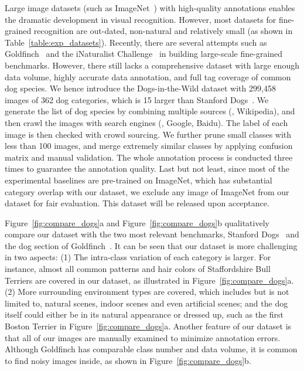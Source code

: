 \documentclass[runningheads]{llncs}
\begin{document}
Large image datasets (such as ImageNet~\cite{deng2009imagenet}) with high-quality annotations enables the dramatic development in visual recognition.
However, most datasets for fine-grained recognition are out-dated, non-natural and relatively small (as shown in Table~\ref{table:exp_datasets}).
Recently, there are several attempts such as Goldfinch~\cite{krause2016unreasonable} and the iNaturalist Challenge~\cite{van2017inaturalist} in building large-scale fine-grained benchmarks.
However, there still lacks a comprehensive dataset with large enough data volume, highly accurate data annotation, and full tag coverage of common dog species.
We hence introduce the Dogs-in-the-Wild dataset with 299,458 images of 362 dog categories, which is 15 larger than Stanford Dogs~\cite{khosla2011novel}.
We generate the list of dog species by combining multiple sources (\eg, Wikipedia), and then crawl the images with search engines (\eg, Google, Baidu).
The label of each image is then checked with crowd sourcing.
We further prune small classes with less than 100 images, and merge extremely similar classes by applying confusion matrix and manual validation.
The whole annotation process is conducted three times to guarantee the annotation quality.
Last but not least, since most of the experimental baselines are pre-trained on ImageNet, which has substantial category overlap with our dataset, we exclude any image of ImageNet from our dataset for fair evaluation.
This dataset will be released upon acceptance.

Figure~\ref{fig:compare_dogs}a and Figure~\ref{fig:compare_dogs}b qualitatively compare our dataset with the two most relevant benchmarks, Stanford Dogs~\cite{khosla2011novel} and the dog section of Goldfinch~\cite{krause2016unreasonable}.
It can be seen that our dataset is more challenging in two aspects:
(1) The intra-class variation of each category is larger.
For instance, almost all common patterns and hair colors of Staffordshire Bull Terriers are covered in our dataset, as illustrated in Figure~\ref{fig:compare_dogs}a.
(2) More surrounding environment types are covered, which includes but is not limited to, natural scenes, indoor scenes and even artificial scenes; and the dog itself could either be in its natural appearance or dressed up, such as the first Boston Terrier in Figure~\ref{fig:compare_dogs}a.
Another feature of our dataset is that all of our images are manually examined to minimize annotation errors.
Although Goldfinch has comparable class number and data volume, it is common to find noisy images inside, as shown in Figure~\ref{fig:compare_dogs}b.
\end{document}
